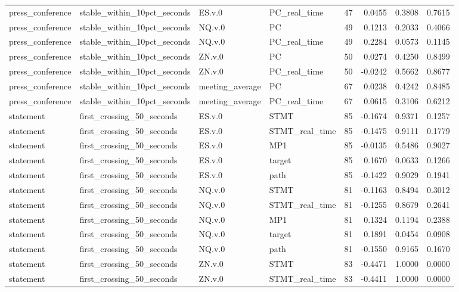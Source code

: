 \begin{tabular}{llllrrrr}
press_conference & stable_within_10pct_seconds & ES.v.0 & PC_real_time & 47 & 0.0455 & 0.3808 & 0.7615 \\
press_conference & stable_within_10pct_seconds & NQ.v.0 & PC & 49 & 0.1213 & 0.2033 & 0.4066 \\
press_conference & stable_within_10pct_seconds & NQ.v.0 & PC_real_time & 49 & 0.2284 & 0.0573 & 0.1145 \\
press_conference & stable_within_10pct_seconds & ZN.v.0 & PC & 50 & 0.0274 & 0.4250 & 0.8499 \\
press_conference & stable_within_10pct_seconds & ZN.v.0 & PC_real_time & 50 & -0.0242 & 0.5662 & 0.8677 \\
press_conference & stable_within_10pct_seconds & meeting_average & PC & 67 & 0.0238 & 0.4242 & 0.8485 \\
press_conference & stable_within_10pct_seconds & meeting_average & PC_real_time & 67 & 0.0615 & 0.3106 & 0.6212 \\
statement & first_crossing_50_seconds & ES.v.0 & STMT & 85 & -0.1674 & 0.9371 & 0.1257 \\
statement & first_crossing_50_seconds & ES.v.0 & STMT_real_time & 85 & -0.1475 & 0.9111 & 0.1779 \\
statement & first_crossing_50_seconds & ES.v.0 & MP1 & 85 & -0.0135 & 0.5486 & 0.9027 \\
statement & first_crossing_50_seconds & ES.v.0 & target & 85 & 0.1670 & 0.0633 & 0.1266 \\
statement & first_crossing_50_seconds & ES.v.0 & path & 85 & -0.1422 & 0.9029 & 0.1941 \\
statement & first_crossing_50_seconds & NQ.v.0 & STMT & 81 & -0.1163 & 0.8494 & 0.3012 \\
statement & first_crossing_50_seconds & NQ.v.0 & STMT_real_time & 81 & -0.1255 & 0.8679 & 0.2641 \\
statement & first_crossing_50_seconds & NQ.v.0 & MP1 & 81 & 0.1324 & 0.1194 & 0.2388 \\
statement & first_crossing_50_seconds & NQ.v.0 & target & 81 & 0.1891 & 0.0454 & 0.0908 \\
statement & first_crossing_50_seconds & NQ.v.0 & path & 81 & -0.1550 & 0.9165 & 0.1670 \\
statement & first_crossing_50_seconds & ZN.v.0 & STMT & 83 & -0.4471 & 1.0000 & 0.0000 \\
statement & first_crossing_50_seconds & ZN.v.0 & STMT_real_time & 83 & -0.4411 & 1.0000 & 0.0000 \\

\end{tabular}
